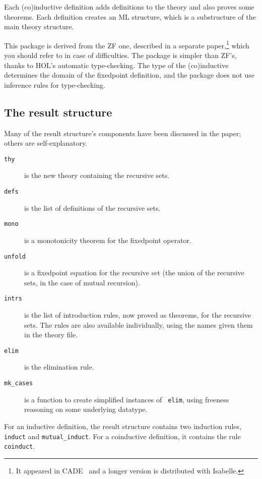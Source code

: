 Each (co)inductive definition adds definitions to the theory and also
proves some theorems.  Each definition creates an ML structure, which is a
substructure of the main theory structure.

This package is derived from the ZF one, described in a
separate paper,\footnote{It appeared in CADE~\cite{paulson-CADE} and a
  longer version is distributed with Isabelle.} which you should refer to
in case of difficulties.  The package is simpler than ZF's, thanks to HOL's
automatic type-checking.  The type of the (co)inductive determines the
domain of the fixedpoint definition, and the package does not use inference
rules for type-checking.


\subsection{The result structure}
Many of the result structure's components have been discussed in the paper;
others are self-explanatory.
\begin{description}
\item[\tt thy] is the new theory containing the recursive sets.

\item[\tt defs] is the list of definitions of the recursive sets.

\item[\tt mono] is a monotonicity theorem for the fixedpoint operator.

\item[\tt unfold] is a fixedpoint equation for the recursive set (the union of
the recursive sets, in the case of mutual recursion).

\item[\tt intrs] is the list of introduction rules, now proved as theorems, for
the recursive sets.  The rules are also available individually, using the
names given them in the theory file. 

\item[\tt elim] is the elimination rule.

\item[\tt mk\_cases] is a function to create simplified instances of {\tt
elim}, using freeness reasoning on some underlying datatype.
\end{description}

For an inductive definition, the result structure contains two induction rules,
{\tt induct} and \verb|mutual_induct|.  For a coinductive definition, it
contains the rule \verb|coinduct|.

